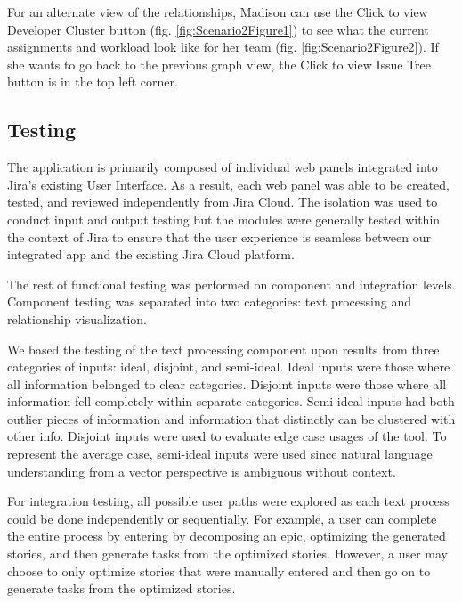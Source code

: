 For an alternate view of the relationships, Madison can use the Click to view Developer Cluster button (fig. \ref{fig:Scenario2Figure1}) to see what the current assignments and workload look like for her team (fig. \ref{fig:Scenario2Figure2}). If she wants to go back to the previous graph view, the Click to view Issue Tree button is in the top left corner.

\subsection{Testing}

The application is primarily composed of individual web panels integrated into Jira’s existing User Interface. As a result, each web panel was able to be created, tested, and reviewed independently from Jira Cloud. The isolation was used to conduct input and output testing but the modules were generally tested within the context of Jira to ensure that the user experience is seamless between our integrated app and the existing Jira Cloud platform.

The rest of functional testing was performed on component and integration levels. Component testing was separated into two categories: text processing and relationship visualization.

We based the testing of the text processing component upon results from three categories of inputs: ideal, disjoint, and semi-ideal. Ideal inputs were those where all information belonged to clear categories. Disjoint inputs were those where all information fell completely within separate categories. Semi-ideal inputs had both outlier pieces of information and information that distinctly can be clustered with other info. Disjoint inputs were used to evaluate edge case usages of the tool. To represent the average case, semi-ideal inputs were used since natural language understanding from a vector perspective is ambiguous without context.

For integration testing, all possible user paths were explored as each text process could be done independently or sequentially. For example, a user can complete the entire process by entering by decomposing an epic, optimizing the generated stories, and then generate tasks from the optimized stories. However, a user may choose to only optimize stories that were manually entered and then go on to generate tasks from the optimized stories. 
